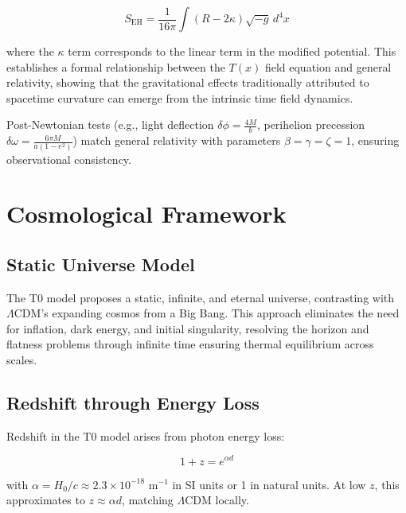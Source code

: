 \documentclass[aps,prl,twocolumn,superscriptaddress,nofootinbib]{revtex4-2}
\newcommand{\Tfield}{T(x)}
\newcommand{\LCDM}{\Lambda\text{CDM}}
\begin{document}
	\begin{equation}
		S_{\text{EH}} = \frac{1}{16\pi} \int (R - 2\kappa) \sqrt{-g} \, d^4x
		\label{eq:einstein_hilbert}
	\end{equation}
	
	where the $\kappa$ term corresponds to the linear term in the modified potential. This establishes a formal relationship between the $\Tfield$ field equation and general relativity, showing that the gravitational effects traditionally attributed to spacetime curvature can emerge from the intrinsic time field dynamics.
	
	Post-Newtonian tests (e.g., light deflection $\delta\phi = \frac{4M}{b}$, perihelion precession $\delta\omega = \frac{6\pi M}{a(1-e^2)}$) match general relativity with parameters $\beta = \gamma = \zeta = 1$, ensuring observational consistency.
	
	\section{Cosmological Framework}
	\label{sec:cosmology}
	
	\subsection{Static Universe Model}
	\label{subsec:static_universe}
	
	The T0 model proposes a static, infinite, and eternal universe, contrasting with $\LCDM$'s expanding cosmos from a Big Bang. This approach eliminates the need for inflation, dark energy, and initial singularity, resolving the horizon and flatness problems through infinite time ensuring thermal equilibrium across scales.
	
	\subsection{Redshift through Energy Loss}
	\label{subsec:redshift_energy_loss}
	
	Redshift in the T0 model arises from photon energy loss:
	
	\begin{equation}
		1 + z = e^{\alpha d}
		\label{eq:redshift_distance}
	\end{equation}
	
	with $\alpha = H_0/c \approx 2.3 \times 10^{-18}$ m$^{-1}$ in SI units or 1 in natural units. At low $z$, this approximates to $z \approx \alpha d$, matching $\LCDM$ locally.
	
\end{document}
